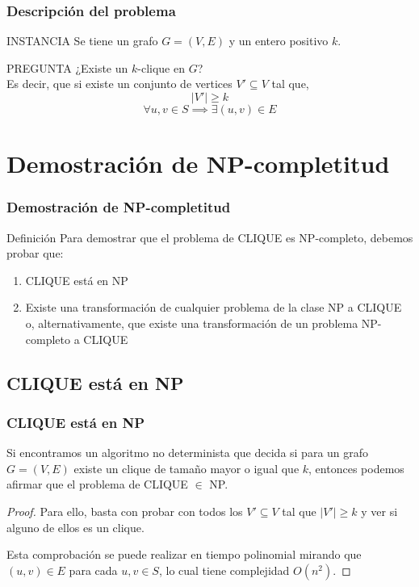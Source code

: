 \documentclass{beamer}
\begin{document}
\begin{frame}
\frametitle{Descripción del problema}
    \begin{block}{INSTANCIA}
    Se tiene un grafo $G=(V, E)$ y un entero positivo $k$.
    \end{block}
    \begin{block}{PREGUNTA}
    \centering ¿Existe un $k$-clique en $G$? \\
    Es decir, que si existe un conjunto de vertices $V' \subseteq V$ tal que, 
    $$ |V'| \geq k $$
    $$ \forall u, v \in S \implies \exists (u, v) \in E $$
    \end{block}
\end{frame}

\section{Demostración de NP-completitud}

\begin{frame}
\frametitle{Demostración de NP-completitud}

    \begin{block}{Definición}
    Para demostrar que el problema de CLIQUE es NP-completo, debemos probar que:
    \begin{enumerate}[I]
        \item CLIQUE está en NP
        \item Existe una transformación de cualquier problema de la clase NP a CLIQUE o, alternativamente, que existe una transformación de un problema NP-completo a CLIQUE
    \end{enumerate}
    \end{block}
    
\end{frame}

\subsection{CLIQUE está en NP}

\begin{frame}
\frametitle{CLIQUE está en NP}
    \begin{theorem}
    Si encontramos un algoritmo no determinista que decida si para un grafo $G = (V,E)$ existe un clique de tamaño mayor o igual que $k$, entonces podemos afirmar que el problema de CLIQUE $\in$ NP.
    \end{theorem}
    
    \begin{proof}
    Para ello, basta con probar con todos los $V' \subseteq V$ tal que $\vert V' \vert \geq k$ y ver si alguno de ellos es un clique.
    
    Esta comprobación se puede realizar en tiempo polinomial mirando que $(u,v) \in E$ para cada $u, v \in S$, lo cual tiene complejidad $O(n^2)$.
    \end{proof}
\end{frame}
\end{document}
